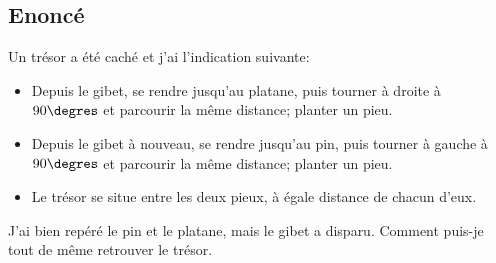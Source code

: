 \documentclass{article}
\begin{document}
\subsection{Enoncé}
Un trésor a été caché et j'ai l'indication suivante:
\begin{itemize}
\item
Depuis le gibet, se rendre jusqu'au platane, puis tourner à droite à $90\degres$ et parcourir la même distance; planter un pieu.
\item
Depuis le gibet à nouveau, se rendre jusqu'au pin, puis tourner à gauche à $90\degres$ et parcourir la même distance; planter un pieu.
\item
Le trésor se situe entre les deux pieux, à égale distance de chacun d'eux.
\end{itemize}
J'ai bien repéré le pin et le platane, mais le gibet a disparu. Comment puis-je tout de même retrouver le trésor.
\end{document}
